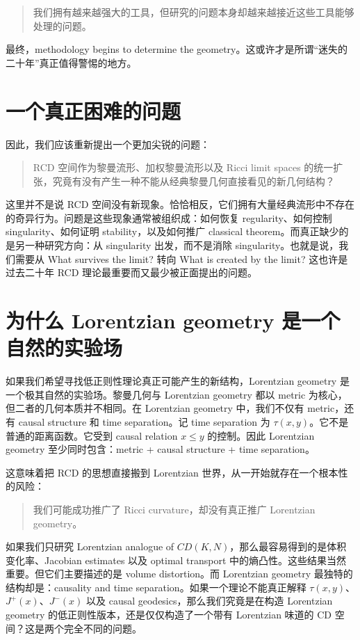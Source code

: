 \documentclass[lualatex]{article}
\begin{document}
\begin{quote}
我们拥有越来越强大的工具，但研究的问题本身却越来越接近这些工具能够处理的问题。
\end{quote}

最终，methodology begins to determine the geometry。这或许才是所谓“迷失的二十年”真正值得警惕的地方。

\section{一个真正困难的问题}

因此，我们应该重新提出一个更加尖锐的问题：

\begin{quote}
RCD 空间作为黎曼流形、加权黎曼流形以及 Ricci limit spaces 的统一扩张，究竟有没有产生一种不能从经典黎曼几何直接看见的新几何结构？
\end{quote}

这里并不是说 RCD 空间没有新现象。恰恰相反，它们拥有大量经典流形中不存在的奇异行为。问题是这些现象通常被组织成：如何恢复 regularity、如何控制 singularity、如何证明 stability，以及如何推广 classical theorem。而真正缺少的是另一种研究方向：从 singularity 出发，而不是消除 singularity。也就是说，我们需要从 What survives the limit? 转向 What is created by the limit? 这也许是过去二十年 RCD 理论最重要而又最少被正面提出的问题。

\section{为什么 Lorentzian geometry 是一个自然的实验场}

如果我们希望寻找低正则性理论真正可能产生的新结构，Lorentzian geometry 是一个极其自然的实验场。黎曼几何与 Lorentzian geometry 都以 metric 为核心，但二者的几何本质并不相同。在 Lorentzian geometry 中，我们不仅有 metric，还有 causal structure 和 time separation。记 time separation 为 $\tau(x,y)$。它不是普通的距离函数。它受到 causal relation $x \leq y$ 的控制。因此 Lorentzian geometry 至少同时包含：metric + causal structure + time separation。

这意味着把 RCD 的思想直接搬到 Lorentzian 世界，从一开始就存在一个根本性的风险：

\begin{quote}
我们可能成功推广了 Ricci curvature，却没有真正推广 Lorentzian geometry。
\end{quote}

如果我们只研究 Lorentzian analogue of $CD(K,N)$，那么最容易得到的是体积变化率、Jacobian estimates 以及 optimal transport 中的熵凸性。这些结果当然重要。但它们主要描述的是 volume distortion。而 Lorentzian geometry 最独特的结构却是：causality and time separation。如果一个理论不能真正解释 $\tau(x,y)$、$J^+(x)$、$J^-(x)$ 以及 causal geodesics，那么我们究竟是在构造 Lorentzian geometry 的低正则性版本，还是仅仅构造了一个带有 Lorentzian 味道的 CD 空间？这是两个完全不同的问题。
\end{document}
